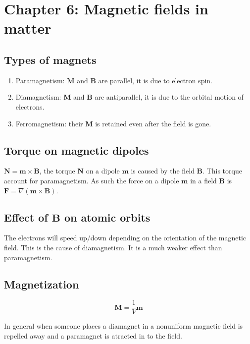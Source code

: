 \documentclass[a4paper]{article}
\begin{document}
\section{Chapter 6: Magnetic fields in matter}

\subsection{Types of magnets}

\begin{enumerate}
    \item Paramagnetism: $\bm{M}$ and $\bm{B}$ are parallel, it is due to electron spin.
    \item Diamagnetism: $\bm{M}$ and $\bm{B}$ are antiparallel, it is due to the orbital motion of electrons.
    \item Ferromagnetism: their $\bm{M}$ is retained even after the field is gone.
\end{enumerate}

\subsection{Torque on magnetic dipoles}

$\bm{N}=\bm{m}\times\bm{B}$, the torque $\bm{N}$ on a dipole $\bm{m}$ is caused by the field $\bm{B}$. This torque account for paramagnetism. As such the force on a dipole $\bm{m}$ in a field $\bm{B}$ is $\bm{F}=\nabla (\bm{m}\times\bm{B})$.

\subsection{Effect of $\bm{B}$ on atomic orbits}

The electrons will speed up/down depending on the orientation of the magnetic field. This is the cause of diamagnetism. It is a much weaker effect than paramagnetism.

\subsection{Magnetization}

\begin{equation}
    \bm{M}=\frac{1}{V}\bm{m}
\end{equation}

In general when someone places a diamagnet in a nonuniform magnetic field is repelled away and a paramagnet is atracted in to the field. 
\end{document}
